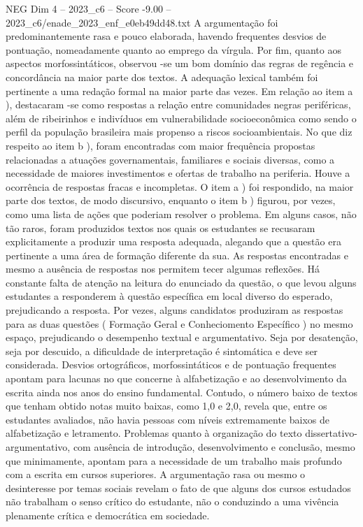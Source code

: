 \begin{textsample}{NEG Dim 4 – 2023\_c6 – Score -9.00 – 2023\_c6/enade\_2023\_enf\_e0eb49dd48.txt}
A argumentação foi predominantemente rasa e pouco elaborada, havendo frequentes desvios de pontuação, nomeadamente quanto ao emprego da vírgula.
Por fim, quanto aos aspectos morfossintáticos, observou -se um bom domínio das regras de regência e concordância na maior parte dos textos.
A adequação lexical também foi pertinente a uma redação formal na maior parte das vezes.
Em relação ao item a ), destacaram -se como respostas a relação entre comunidades negras periféricas, além de ribeirinhos e indivíduos em vulnerabilidade socioeconômica como sendo o perfil da população brasileira mais propenso a riscos socioambientais.
No que diz respeito ao item b ), foram encontradas com maior frequência propostas relacionadas a atuações governamentais, familiares e sociais diversas, como a necessidade de maiores investimentos e ofertas de trabalho na periferia.
Houve a ocorrência de respostas fracas e incompletas.
O item a ) foi respondido, na maior parte dos textos, de modo discursivo, enquanto o item b ) figurou, por vezes, como uma lista de ações que poderiam resolver o problema.
Em alguns casos, não tão raros, foram produzidos textos nos quais os estudantes se recusaram explicitamente a produzir uma resposta adequada, alegando que a questão era pertinente a uma área de formação diferente da sua.
As respostas encontradas e mesmo a ausência de respostas nos permitem tecer algumas reflexões.
Há constante falta de atenção na leitura do enunciado da questão, o que levou alguns estudantes a responderem à questão específica em local diverso do esperado, prejudicando a resposta.
Por vezes, alguns candidatos produziram as respostas para as duas questões ( Formação Geral e Conheciomento Específico ) no mesmo espaço, prejudicando o desempenho textual e argumentativo.
Seja por desatenção, seja por descuido, a dificuldade de interpretação é sintomática e deve ser considerada.
Desvios ortográficos, morfossintáticos e de pontuação frequentes apontam para lacunas no que concerne à alfabetização e ao desenvolvimento da escrita ainda nos anos do ensino fundamental.
Contudo, o número baixo de textos que tenham obtido notas muito baixas, como 1,0 e 2,0, revela que, entre os estudantes avaliados, não havia pessoas com níveis extremamente baixos de alfabetização e letramento.
Problemas quanto à organização do texto dissertativo-argumentativo, com ausência de introdução, desenvolvimento e conclusão, mesmo que minimamente, apontam para a necessidade de um trabalho mais profundo com a escrita em cursos superiores.
A argumentação rasa ou mesmo o desinteresse por temas sociais revelam o fato de que alguns dos cursos estudados não trabalham o senso crítico do estudante, não o conduzindo a uma vivência plenamente crítica e democrática em sociedade.

\end{textsample}
